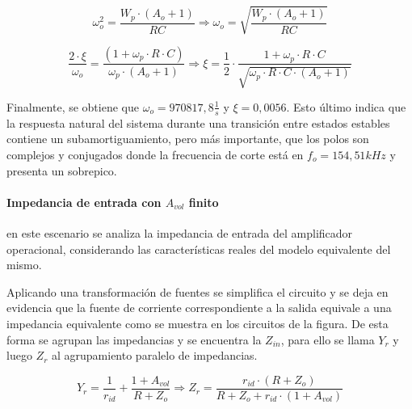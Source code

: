 \begin{equation}
	\omega_o^{2} = \frac{W_p \cdot (A_o + 1)}{RC} \Rightarrow \omega_o = \sqrt{\frac{W_p \cdot (A_o + 1)}{RC}}	
\end{equation}

\begin{equation}
	\frac{2 \cdot \xi}{\omega_o} = \frac{(1 + \omega_p \cdot R \cdot C)}{\omega_p \cdot(A_o + 1)}
	\Rightarrow \xi = \frac{1}{2} \cdot \frac{1 + \omega_p \cdot R \cdot C}{\sqrt{\omega_p \cdot R \cdot C \cdot (A_o + 1)}}
\end{equation}

Finalmente, se obtiene que $\omega_o = 970817,8 \frac{1}{s}$ y $\xi = 0,0056$. Esto \'ultimo indica que la respuesta natural del sistema durante una transici\'on entre estados estables contiene un subamortiguamiento, pero m\'as importante, que los polos son complejos y conjugados donde la frecuencia de corte est\'a en $f_o = 154,51kHz$ y presenta un sobrepico.


\paragraph*{Impedancia de entrada con $A_{vol}$ finito} en este escenario se analiza la impedancia de entrada del amplificador operacional, considerando las caracter\'isticas reales del modelo equivalente del mismo.



Aplicando una transformaci\'on de fuentes se simplifica el circuito y se deja en evidencia que la fuente de corriente correspondiente a la salida equivale a una impedancia equivalente como se muestra en los circuitos de la figura. %
De esta forma se agrupan las impedancias y se encuentra la $Z_{in}$, para ello se llama $Y_r$ y luego $Z_r$ al agrupamiento paralelo de impedancias.

\begin{equation}
	Y_r = \frac{1}{r_{id}} + \frac{1 + A_{vol}}{R + Z_o} \Rightarrow
	Z_r = \frac{r_{id} \cdot(R + Z_o)}{R + Z_o + r_{id} \cdot(1 + A_{vol})}
\end{equation}

